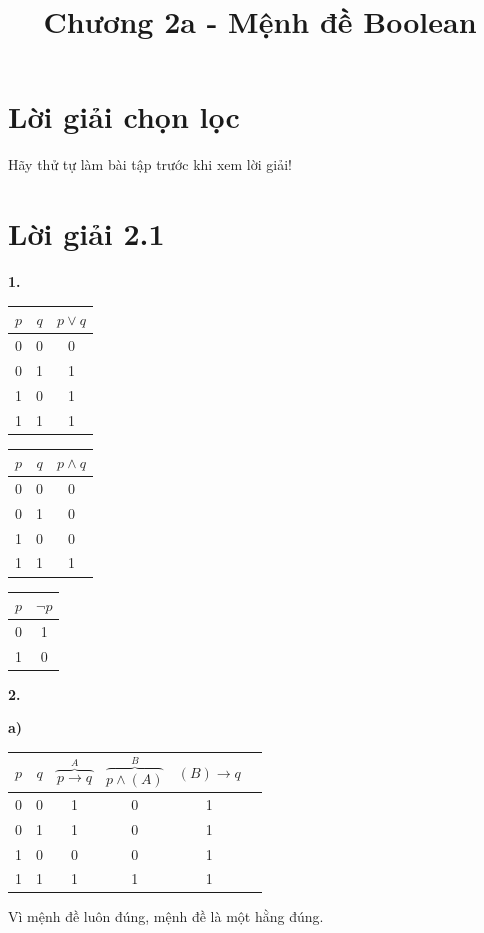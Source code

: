 \documentclass[12pt,a4paper]{article}
\title{Chương 2a - Mệnh đề Boolean}
\author{}
\date{}
\theoremstyle{definition}
\begin{document}
\maketitle
\tableofcontents
\newpage

\section{Lời giải chọn lọc}

\begin{warningbox}
Hãy thử tự làm bài tập trước khi xem lời giải!
\end{warningbox}

\section*{Lời giải 2.1}

\textbf{1.}

\begin{center}
\begin{tabular}{cc|c}
$p$ & $q$ & $p \lor q$ \\
\hline
0 & 0 & 0 \\
0 & 1 & 1 \\
1 & 0 & 1 \\
1 & 1 & 1
\end{tabular}
\qquad
\begin{tabular}{cc|c}
$p$ & $q$ & $p \land q$ \\
\hline
0 & 0 & 0 \\
0 & 1 & 0 \\
1 & 0 & 0 \\
1 & 1 & 1
\end{tabular}
\qquad
\begin{tabular}{c|c}
$p$ & $\neg p$ \\
\hline
0 & 1 \\
1 & 0
\end{tabular}
\end{center}

\medskip
\textbf{2.}

\textbf{a)}
\begin{center}
\begin{tabular}{cc|cccc}
$p$ & $q$ & $\overbrace{p \to q}^{A}$ & $\overbrace{p \land (A)}^{B}$ & $(B) \to q$ \\
\hline
0 & 0 & 1 & 0 & 1 \\
0 & 1 & 1 & 0 & 1 \\
1 & 0 & 0 & 0 & 1 \\
1 & 1 & 1 & 1 & 1
\end{tabular}
\end{center}
Vì mệnh đề luôn đúng, mệnh đề là một hằng đúng.
\end{document}
